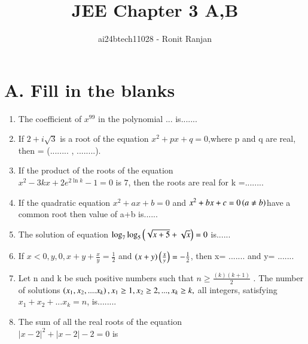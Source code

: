 \documentclass[journal,12pt,twocolumn]{IEEEtran}
\theoremstyle{remark}
\begin{document}

\vspace{3cm}

\title{JEE Chapter 3 A,B}
\author{ai24btech11028 - Ronit Ranjan}
\maketitle
\newpage
\bigskip
\section*{A. Fill in the blanks}
\begin{enumerate}
    \item The coefficient of $x^{99}$ in the polynomial ...
    is.......\hfill {}
    
    \item If $2+i\sqrt{3}$ is a root of the equation $x^2 + px +q =0$,where p and q are real, then  = (........ , ........).\hfill {}
    
    \item If the product of the roots of the equation\\ $x^2 -3kx +2e^{2\ln{k}} -1=0$ is $7$, then the roots are real for k =........\hfill {}
    
    \item If the quadratic equation $x^2 + ax +b=0$ and $x^2 + bx + c=0 \left(a \ne b\right)$have a common root then value of a+b is......\hfill {}
    
    \item The solution of equation $\log_{7}\log_{5}\left(\sqrt{x+5}+\sqrt{x}\right)=0$ is......\hfill {}
    
    \item If $x<0, y,0, x + y + \frac{x}{y} = \frac{1}{2}$ and $\left(x+y\right)\left(\frac{x
    }{y}\right) = -\frac{1}{2}$, then x= ....... and y= .......\hfill {}
    
    \item Let n and k be such positive numbers such that $n \geq \frac{(k)(k+1)}{2}$ . The number of solutions $\left(x_1,x_2,....x_k\right), x_1 \geq 1, x_2 \geq 2,...,x_k \geq k, $ all integers, satisfying $x_1+x_2+...x_k = n$, is........  \hfill {}
    \item The sum of all the real roots of the equation\\$|x-2|^2+|x-2|-2 = 0$ is \hfill {}
\end{enumerate}
\end{document}
